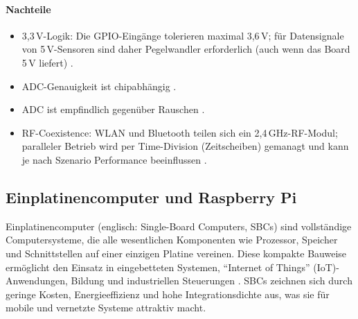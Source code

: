 \paragraph{Nachteile}
\begin{itemize}
	\item 3,3\,V-Logik: Die GPIO-Eingänge tolerieren maximal 3,6\,V; für Datensignale von 5\,V-Sensoren sind daher Pegelwandler erforderlich (auch wenn das Board 5\,V liefert) \autocite{EspressifESP32Datasheet}.
	
	
	\item ADC-Genauigkeit ist chipabhängig \autocite{EspressifADCCalibration}. %
	
	\item ADC ist empfindlich gegenüber Rauschen \autocite{EspressifADCCalibration}. %
	
	
	\item RF-Coexistence: WLAN und Bluetooth teilen sich ein 2{,}4\,GHz-RF-Modul; paralleler Betrieb wird per Time-Division (Zeitscheiben) gemanagt und kann je nach Szenario Performance beeinflussen \autocite{EspressifESP32Coexistence}. %
	
\end{itemize}

\subsection{Einplatinencomputer und Raspberry Pi}

Einplatinencomputer (englisch: Single-Board Computers, SBCs) sind vollständige Computersysteme, die alle wesentlichen Komponenten wie Prozessor, Speicher und Schnittstellen auf einer einzigen Platine vereinen. Diese kompakte Bauweise ermöglicht den Einsatz in eingebetteten Systemen, \enquote{Internet of Things} (IoT)-Anwendungen, Bildung und industriellen Steuerungen \autocite{Alvarez2022,Pajankar2017}. SBCs zeichnen sich durch geringe Kosten, Energieeffizienz und hohe Integrationsdichte aus, was sie für mobile und vernetzte Systeme attraktiv macht.

